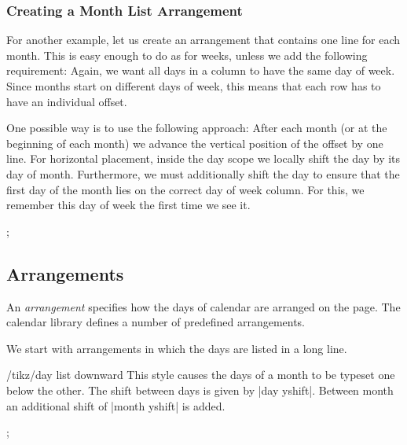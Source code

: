 \subsubsection{Creating a Month List Arrangement}

For another example, let us create an arrangement that contains one
line for each month. This is easy enough to do as for weeks, unless we
add the following requirement: Again, we want all days in a column to
have the same day of week. Since months start on different days of
week, this means that each row has to have an individual offset.

One possible way is to use the following approach: After each month
(or at the beginning of each month) we advance the vertical position
of the offset by one line. For horizontal placement, inside the day
scope we locally shift the day by its day of month. Furthermore, we
must additionally shift the day to ensure that the first day of the
month lies on the correct day of week column. For this, we remember
this day of week the first time we see it.
\begin{codeexample}[]
\newcount\mycount
\tikz
  \calendar
    [dates=2000-01-01 to 2000-02-last,
     execute before day scope=
     {
       \ifdate{day of month=1} {
         \mycount=\pgfcalendarcurrentweekday
         \pgftransformyshift{-1em}
       }{}
     },
     execute at begin day scope=
     {
       \pgftransformxshift{\pgfcalendarcurrentday em}
       \pgftransformxshift{\the\mycount em}
     }];
\end{codeexample}


\subsection{Arrangements}

An \emph{arrangement} specifies how the days of calendar are arranged
on the page. The calendar library defines a number of predefined
arrangements.

We start with arrangements in which the days are listed in a long
line.

\begin{stylekey}{/tikz/day list downward}
  This style causes the days of a month to be typeset one below the
  other. The shift between days is given by |day yshift|. Between
  month an additional shift of |month yshift| is added.
\begin{codeexample}[]
\tikz
  \calendar [dates=2000-01-28 to 2000-02-03,
             day list downward,month yshift=1em];
\end{codeexample}
\end{stylekey}

